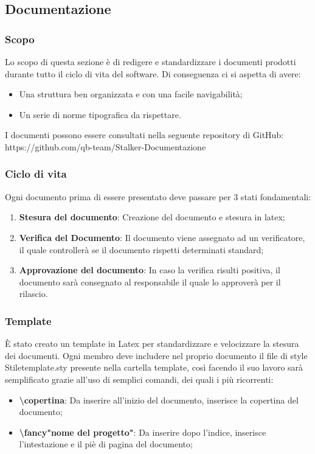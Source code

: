 \subsection{Documentazione}
\subsubsection{Scopo}
Lo scopo di questa sezione è di redigere e standardizzare i documenti prodotti durante tutto il ciclo di vita del software. 
Di conseguenza ci si aspetta di avere:
\begin{itemize}
\item Una struttura ben organizzata e con una facile navigabilità;
\item Un serie di norme tipografica da rispettare.
\end{itemize}
 
I documenti possono essere consultati nella seguente repository di GitHub: https://github.com/qb-team/Stalker-Documentazione

\subsubsection{Ciclo di vita}
Ogni documento prima di essere presentato deve passare per 3 stati fondamentali:
\begin{enumerate}
\item \textbf{Stesura del documento}: Creazione del documento e stesura in latex;
\item \textbf{Verifica del Documento}: Il documento viene assegnato ad un verificatore, il quale controllerà se il documento rispetti determinati standard;
\item \textbf{Approvazione del documento}: In caso la verifica risulti positiva, il documento sarà consegnato al responsabile il quale lo approverà per il rilascio.
\end{enumerate}

\subsubsection{Template}
È stato creato un template in Latex per standardizzare e velocizzare la stesura dei documenti.
Ogni membro deve includere nel proprio documento il file di style Stiletemplate.sty presente nella cartella template, così facendo il suo lavoro sarà semplificato grazie all'uso di semplici comandi, dei quali i più ricorrenti:
\begin{itemize}
\item \textbf{\textbackslash copertina{}}: Da inserire all'inizio del documento, inserisce la copertina del documento;
\item \textbf{\textbackslash fancy"nome del progetto"{}}: Da inserire dopo l'indice, inserisce l'intestazione e il piè di pagina del documento;
\end{itemize}

